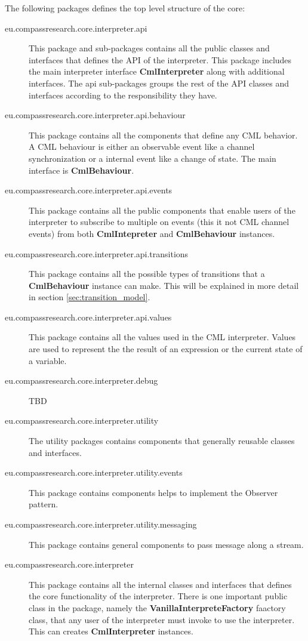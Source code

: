 \documentclass[a4paper, 10pt]{include/compassreport}   %
\begin{document}
The following packages defines the top level structure of the core:
\begin{description}
\item[eu.compassresearch.core.interpreter.api] This package and
  sub-packages contains all the public classes and interfaces that
  defines the API of the interpreter. This package includes the main
  interpreter interface \textbf{CmlInterpreter} along with additional
  interfaces.
  The api sub-packages groups the rest of the API classes and
  interfaces according to the responsibility they have.

\item[eu.compassresearch.core.interpreter.api.behaviour] This package
  contains all the components that define any CML behavior. A CML
  behaviour is either an observable event like a channel synchronization
  or a internal event like a change of state. The main interface is
  \textbf{CmlBehaviour}.

\item[eu.compassresearch.core.interpreter.api.events] This package
  contains all the public components that enable users of the
  interpreter to subscribe to multiple on events (this it not CML
  channel events) from both \textbf{CmlIntepreter} and
  \textbf{CmlBehaviour} instances.

\item[eu.compassresearch.core.interpreter.api.transitions] This
  package contains all the possible types of transitions that a
  \textbf{CmlBehaviour} instance can make. This will be explained in
  more detail in section \ref{sec:transition_model}.

\item[eu.compassresearch.core.interpreter.api.values] This package
  contains all the values used in the CML interpreter. Values are used
  to represent the the result of an expression or the current state of a
  variable.

\item[eu.compassresearch.core.interpreter.debug] TBD

\item[eu.compassresearch.core.interpreter.utility] The utility
  packages contains components that generally reusable classes and
  interfaces. 

\item[eu.compassresearch.core.interpreter.utility.events] This package
  contains components helps to implement the Observer pattern. 

\item[eu.compassresearch.core.interpreter.utility.messaging] This
  package contains general components to pass message along a stream.

\item[eu.compassresearch.core.interpreter] This package contains all
  the internal classes and interfaces that defines the core
  functionality of the interpreter. There is one important public class
  in the package, namely the \textbf{VanillaInterpreteFactory} faactory
  class, that any user of the interpreter must invoke to use the
  interpreter. This can creates \textbf{CmlInterpreter} instances.

\end{description}
\end{document}
